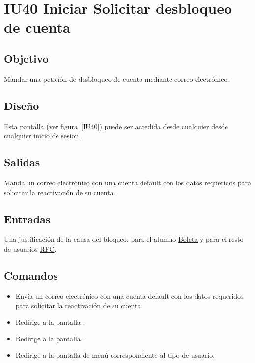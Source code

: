 
\section{IU40 Iniciar Solicitar desbloqueo de cuenta}

\subsection{Objetivo}
    Mandar una petición de desbloqueo de cuenta mediante correo electrónico.

\subsection{Diseño}
	Esta pantalla  (ver figura~\ref{IU40}) puede ser accedida desde cualquier desde cualquier inicio de sesion.



\subsection{Salidas}

    Manda un correo electrónico con una cuenta default con los datos requeridos para solicitar la reactivación de su cuenta.

\subsection{Entradas}
    Una justificación de la causa del bloqueo, para el alumno \hyperlink{Alumno.Boleta}{Boleta} y para el resto de usuarios \hyperlink{Empleado.RFC}{RFC}.


\subsection{Comandos}
\begin{itemize}

    \item {} Envía un correo electrónico con una cuenta default con los datos requeridos para solicitar la reactivación de su cuenta
    \item {} Redirige a la pantalla .
    \item {} Redirige a la pantalla .
    \item {} Redirige a la pantalla de menú correspondiente al tipo de usuario.
	
\end{itemize}

